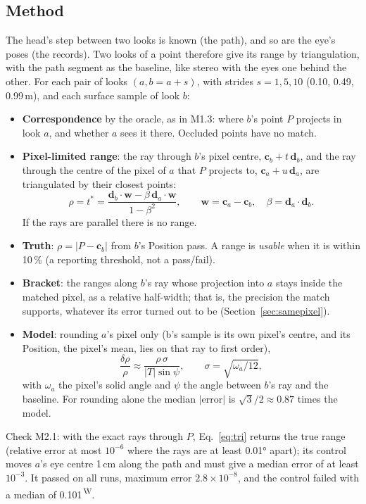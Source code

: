 \documentclass[11pt,a4paper]{article}
\newcommand{\vb}[1]{\mathbf{#1}}
\newcommand{\src}[1]{\textsuperscript{\,#1}}
\newcommand{\WS}{\src{W}}   %
\begin{document}
\subsection{Method}

The head's step between two looks is known (the path), and so are the eye's poses (the records). Two looks of a point
therefore give its range by triangulation, with the path segment as the baseline, like stereo with the eyes one behind
the other. For each pair of looks $(a, b{=}a{+}s)$, with strides $s=1,5,10$ (0.10, 0.49, 0.99\,m), and each surface
sample of look $b$:
\begin{itemize}
\item \textbf{Correspondence} by the oracle, as in M1.3: where $b$'s point $P$ projects in look $a$, and whether $a$ sees
  it there. Occluded points have no match.
\item \textbf{Pixel-limited range}: the ray through $b$'s pixel centre, $\vb c_b+t\,\vb d_b$, and the ray through the
  centre of the pixel of $a$ that $P$ projects to, $\vb c_a+u\,\vb d_a$, are triangulated by their closest points:
  \begin{equation}\label{eq:tri}
    \hat\rho = t^\ast = \frac{\vb d_b\!\cdot\!\vb w - \beta\,\vb d_a\!\cdot\!\vb w}{1-\beta^2},\qquad
    \vb w = \vb c_a-\vb c_b,\quad \beta = \vb d_a\!\cdot\!\vb d_b .
  \end{equation}
  If the rays are parallel there is no range.
\item \textbf{Truth}: $\rho=|P-\vb c_b|$ from $b$'s Position pass. A range is \emph{usable} when it is within 10\,\% (a
  reporting threshold, not a pass/fail).
\item \textbf{Bracket}: the ranges along $b$'s ray whose projection into $a$ stays inside the matched pixel, as a relative
  half-width; that is, the precision the match supports, whatever its error turned out to be (Section~\ref{sec:samepixel}).
\item \textbf{Model}: rounding $a$'s pixel only (b's sample is its own pixel's centre, and its Position, the pixel's mean,
  lies on that ray to first order),
  \begin{equation}\label{eq:model}
    \frac{\delta\rho}{\rho} \approx \frac{\rho\,\sigma}{|T|\sin\psi},\qquad \sigma=\sqrt{\omega_a/12},
  \end{equation}
  with $\omega_a$ the pixel's solid angle and $\psi$ the angle between $b$'s ray and the baseline. For rounding alone the
  median $|$error$|$ is $\sqrt3/2\approx0.87$ times the model.
\end{itemize}
Check M2.1: with the exact rays through $P$, Eq.~\eqref{eq:tri} returns the true range (relative error at most
$10^{-6}$ where the rays are at least 0.01° apart); its control moves $a$'s eye centre 1\,cm along the path and must
give a median error of at least $10^{-3}$. It passed on all runs, maximum error $2.8\times10^{-8}$, and the control
failed with a median of 0.101\WS.
\end{document}
